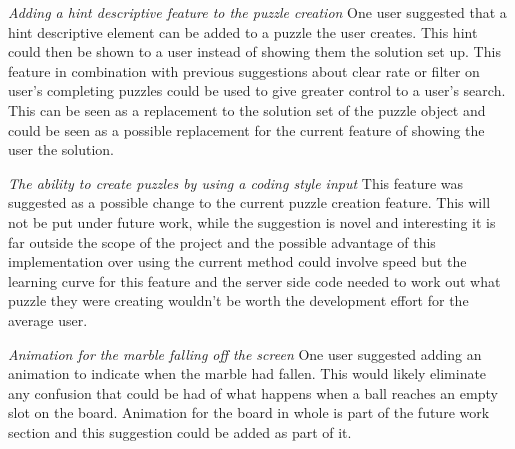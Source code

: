 \documentclass{l4proj}
\begin{document}
\emph{Adding a hint descriptive feature to the puzzle creation}
One user suggested that a hint descriptive element can be added to a puzzle the user creates. This hint could then be shown to a user instead of showing them the solution set up. This feature in combination with previous suggestions about clear rate or filter on user's completing puzzles could be used to give greater control to a user's search. This can be seen as a replacement to the solution set of the puzzle object and could be seen as a possible replacement for the current feature of showing the user the solution.

\emph{The ability to create puzzles by using a coding style input}
This feature was suggested as a possible change to the current puzzle creation feature. This will not be put under future work, while the suggestion is novel and interesting it is far outside the scope of the project and the possible advantage of this implementation over using the current method could involve speed but the learning curve for this feature and the server side code needed to work out what puzzle they were creating wouldn't be worth the development effort for the average user.

\emph{Animation for the marble falling off the screen}
One user suggested adding an animation to indicate when the marble had fallen. This would likely eliminate any confusion that could be had of what happens when a ball reaches an empty slot on the board. Animation for the board in whole is part of the future work section and this suggestion could be added as part of it.
\end{document}
